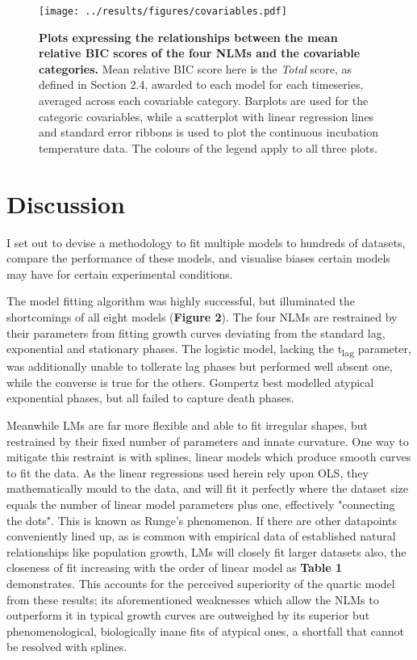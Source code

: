 \documentclass[11pt]{article}
\begin{document}
\begin{figure*}
    \centering
    \texttt{[image: ../results/figures/covariables.pdf]} %
    \caption{\textbf{Plots expressing the relationships between the mean relative BIC scores of the four NLMs and the covariable categories.}  Mean relative BIC score here is the \textit{Total} score, as defined in Section 2.4, awarded to each model for each timeseries, averaged across each covariable category. Barplots are used for the categoric covariables, while a scatterplot with linear regression lines and standard error ribbons is used to plot the continuous incubation temperature data. The colours of the legend apply to all three plots.}
\end{figure*}





\section{Discussion}%

I set out to devise a methodology to fit multiple models to hundreds of datasets, compare the performance of these models, and visualise biases certain models may have for certain experimental conditions.

The model fitting algorithm was highly successful, but illuminated the shortcomings of all eight models (\textbf{Figure 2}). The four NLMs are restrained by their parameters from fitting growth curves deviating from the standard lag, exponential and stationary phases. The logistic model, lacking the t\textsubscript{lag} parameter, was additionally unable to tollerate lag phases but performed well absent one, while the converse is true for the others. Gompertz best modelled atypical exponential phases, but all failed to capture death phases.

Meanwhile LMs are far more flexible and able to fit irregular shapes, but restrained by their fixed number of parameters and innate curvature. One way to mitigate this restraint is with splines, linear models which produce smooth curves to fit the data.\parencite{White2017} As the linear regressions used herein rely upon OLS, they mathematically mould to the data, and will fit it perfectly where the dataset size equals the number of linear model parameters plus one, effectively "connecting the dots". This is known as Runge's phenomenon.\parencite{White2017} If there are other datapoints conveniently lined up, as is common with empirical data of established natural relationships like population growth, LMs will closely fit larger datasets also, the closeness of fit increasing with the order of linear model as \textbf{Table 1} demonstrates. This accounts for the perceived superiority of the quartic model from these results; its aforementioned weaknesses which allow the NLMs to outperform it in typical growth curves are outweighed by its superior but phenomenological, biologically inane fits of atypical ones, a shortfall that cannot be resolved with splines.
\end{document}
